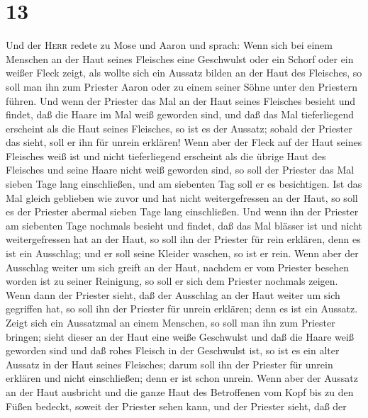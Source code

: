 \hypertarget{section-12}{%
\section{13}\label{section-12}}

 Und der \textsc{Herr} redete zu Mose und Aaron und
sprach:  Wenn sich bei einem Menschen an der Haut seines
Fleisches eine Geschwulst oder ein Schorf oder ein weißer Fleck zeigt,
als wollte sich ein Aussatz bilden an der Haut des Fleisches, so soll
man ihn zum Priester Aaron oder zu einem seiner Söhne unter den
Priestern führen.  Und wenn der Priester das Mal an der
Haut seines Fleisches besieht und findet, daß die Haare im Mal weiß
geworden sind, und daß das Mal tieferliegend erscheint als die Haut
seines Fleisches, so ist es der Aussatz; sobald der Priester das sieht,
soll er ihn für unrein erklären!  Wenn aber der Fleck auf
der Haut seines Fleisches weiß ist und nicht tieferliegend erscheint als
die übrige Haut des Fleisches und seine Haare nicht weiß geworden sind,
so soll der Priester das Mal sieben Tage lang einschließen,
 und am siebenten Tag soll er es besichtigen. Ist das Mal
gleich geblieben wie zuvor und hat nicht weitergefressen an der Haut, so
soll es der Priester abermal sieben Tage lang einschließen.
 Und wenn ihn der Priester am siebenten Tage nochmals
besieht und findet, daß das Mal blässer ist und nicht weitergefressen
hat an der Haut, so soll ihn der Priester für rein erklären, denn es ist
ein Ausschlag; und er soll seine Kleider waschen, so ist er rein.
 Wenn aber der Ausschlag weiter um sich greift an der
Haut, nachdem er vom Priester besehen worden ist zu seiner Reinigung, so
soll er sich dem Priester nochmals zeigen.  Wenn dann der
Priester sieht, daß der Ausschlag an der Haut weiter um sich gegriffen
hat, so soll ihn der Priester für unrein erklären; denn es ist ein
Aussatz.  Zeigt sich ein Aussatzmal an einem Menschen, so
soll man ihn zum Priester bringen;  sieht dieser an der
Haut eine weiße Geschwulst und daß die Haare weiß geworden sind und daß
rohes Fleisch in der Geschwulst ist,  so ist es ein alter
Aussatz in der Haut seines Fleisches; darum soll ihn der Priester für
unrein erklären und nicht einschließen; denn er ist schon unrein.
 Wenn aber der Aussatz an der Haut ausbricht und die
ganze Haut des Betroffenen vom Kopf bis zu den Füßen bedeckt, soweit der
Priester sehen kann,  und der Priester sieht, daß der
